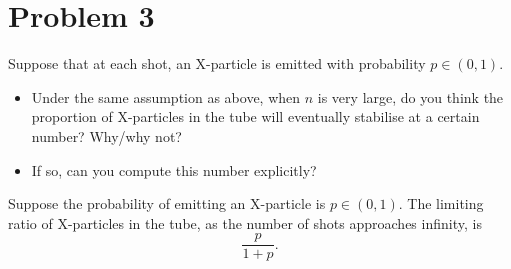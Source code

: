 \section{Problem 3}

Suppose that at each shot, an X-particle is emitted with probability $p \in (0, 1)$.
\begin{itemize}

  \item Under the same assumption as above, when $n$ is very large, do you think the proportion of X-particles in the tube will eventually stabilise at a certain number? Why/why not?
  \item If so, can you compute this number explicitly?
\end{itemize}

\begin{theorem}
  Suppose the probability of emitting an X-particle is $p\in(0,1)$. The limiting ratio of X-particles in the tube, as the number of shots approaches infinity, is \[
  \frac{p}{1+p}
  .\]
\end{theorem}
